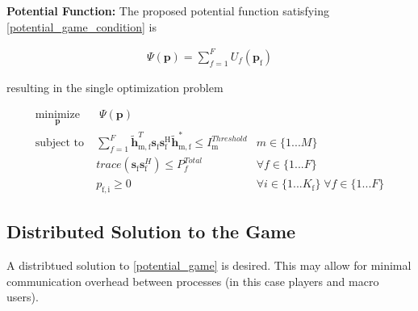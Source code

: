 \documentclass[12pt,a4paper]{report}
\begin{document}
\textbf{Potential Function:} The proposed potential function satisfying \eqref{potential_game_condition} is 

\begin{gather*} \label{Potential_Function}
\Psi(\mathbf{p}) = \sum_{f = 1}^{F} U_f(\mathbf{p_{\mathrm{f}}}) 
\end{gather*}

resulting in the single optimization problem
	
		\begin{subequations}
	\label{optim}
	\begin{align}
	    \underset{\mathbf{p}}{\text{minimize}}
	    & \; \Psi(\mathbf{p}) \label{potential_game} \\
	    \text{subject to} \; &
	  \sum^F_{f=1} \mathbf{\tilde{h}}_{\mathrm{m,f}}^T  \mathbf{s}_{\mathrm{f}} 						
	\mathbf{s_{\mathrm{f}}^{\mathrm{H}}} \mathbf{\tilde{h}_{\mathrm{m,f}}^*} \leq I^{Threshold}		
	_{\mathrm{m}} & m \in \{1 ...M\} 
		\label{interference_const}\\
        & trace(\mathbf{s}_\mathrm{f}\mathbf{s}_\mathrm{f}^H)  \leq P^{Total}_{f}  \label{power_const}
        & \forall f \in \{1 ... F\}\\
        & p_{\mathrm{f,i}} \geq 0 &  \forall i \in \{1 ...K_{\mathrm{f}}\} \; \forall f \in \{1 ... F\}\label{pos_power_const}
	\end{align}
	\end{subequations}


\subsection{Distributed Solution to the Game}
A distribtued solution to \eqref{potential_game} is desired. This may allow for minimal communication overhead between processes (in this case players and macro users).
\end{document}
